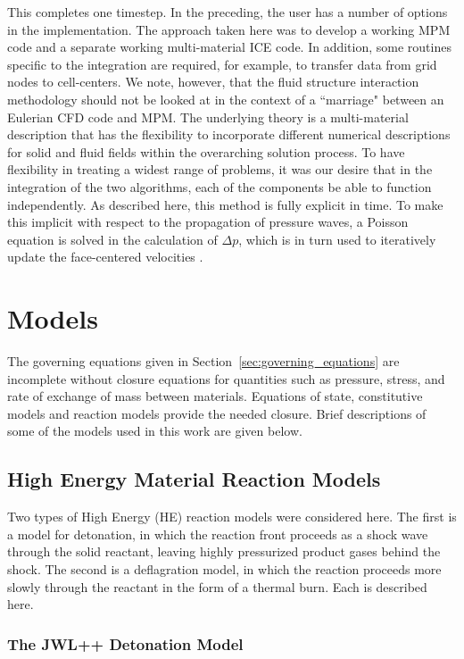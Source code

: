 This completes one timestep.  In the preceding, the user has a number of
options in the implementation.  The approach taken here was to develop a 
working MPM code and a separate working multi-material ICE code.  In 
addition, some routines specific to the integration are required, for 
example, to transfer data from grid nodes to cell-centers.  We 
note, however, that the fluid structure interaction methodology should 
not be looked at in the context of a ``marriage" between an Eulerian CFD 
code and MPM.  The underlying theory is a multi-material description
that has the flexibility to incorporate different numerical descriptions for 
solid and fluid fields within the overarching solution process. 
To have flexibility in treating a widest range of problems, it was our 
desire that in the integration of the two algorithms, each of the components 
be able to function independently.  As described here, this method is fully 
explicit in time.  To make this implicit with respect to the propagation 
of pressure waves, a Poisson equation is solved in the calculation of 
$\Delta p$, which is in turn used to iteratively update the face-centered 
velocities \cite{Kashiwa1994a}.

\section{Models}\label{sec:models}

The governing equations given in Section~\ref{sec:governing_equations} are 
incomplete without closure equations for quantities such as pressure, stress, 
and rate of exchange of mass between materials.  Equations of 
state, constitutive models and reaction models provide
the needed closure.  Brief descriptions of some of the models used in this work 
are given below.

\subsection{High Energy Material Reaction Models}\label{sec:HEReaction}

Two types of High Energy (HE) reaction models were considered here.  The first 
is a model for detonation, in which the reaction front proceeds as a shock 
wave through the solid reactant, leaving highly pressurized product gases 
behind the shock.  The second is a deflagration model, in which the 
reaction proceeds more slowly through the reactant in the form of a thermal
burn.  Each is described here.

\subsubsection{The JWL++ Detonation Model}\label{sec:JWLPP}

